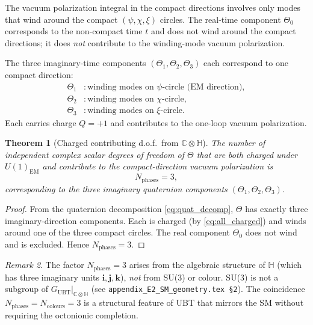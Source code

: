 \documentclass[12pt,a4paper]{article}
\newtheorem{theorem}{Theorem}[section]
\theoremstyle{definition}
\theoremstyle{remark}
\newtheorem{remark}[theorem]{Remark}
\newcommand{\C}{\mathbb{C}}
\renewcommand{\H}{\mathbb{H}}
\begin{document}
The vacuum polarization integral in the compact directions involves only modes
that wind around the compact $(\psi,\chi,\xi)$ circles.  The real-time
component $\Theta_0$ corresponds to the non-compact time $t$ and does not
wind around the compact directions; it does \emph{not} contribute to the
winding-mode vacuum polarization.

The three imaginary-time components $(\Theta_1, \Theta_2, \Theta_3)$ each
correspond to one compact direction:
\begin{align}
  \Theta_1 &: \text{winding modes on }\psi\text{-circle (EM direction)},\\
  \Theta_2 &: \text{winding modes on }\chi\text{-circle},\\
  \Theta_3 &: \text{winding modes on }\xi\text{-circle}.
\end{align}
Each carries charge $Q=+1$ and contributes to the one-loop vacuum polarization.

\begin{theorem}[Charged contributing d.o.f.\ from $\C \otimes \H$]
\label{thm:N_phases}
  The number of independent complex scalar degrees of freedom of $\Theta$
  that are both \emph{charged under $U(1)_\mathrm{EM}$} and \emph{contribute
  to the compact-direction vacuum polarization} is
  \begin{equation}
    N_{\mathrm{phases}} = 3,
    \label{eq:N_phases}
  \end{equation}
  corresponding to the three imaginary quaternion components
  $(\Theta_1, \Theta_2, \Theta_3)$.
\end{theorem}

\begin{proof}
  From the quaternion decomposition \eqref{eq:quat_decomp}, $\Theta$ has exactly
  three imaginary-direction components.  Each is charged (by \eqref{eq:all_charged})
  and winds around one of the three compact circles.  The real component $\Theta_0$
  does not wind and is excluded.  Hence $N_\mathrm{phases} = 3$.
\end{proof}

\begin{remark}
  The factor $N_\mathrm{phases} = 3$ arises from the algebraic structure of
  $\H$ (which has three imaginary units $\mathbf{i}, \mathbf{j}, \mathbf{k}$),
  \emph{not} from SU(3) or colour.  SU(3) is not a subgroup of
  $G_\mathrm{UBT}|_{\C \otimes \H}$ (see \texttt{appendix\_E2\_SM\_geometry.tex §2}).
  The coincidence $N_\mathrm{phases} = N_\mathrm{colours} = 3$ is a
  structural feature of UBT that mirrors the SM without requiring
  the octonionic completion.
\end{remark}
\end{document}
